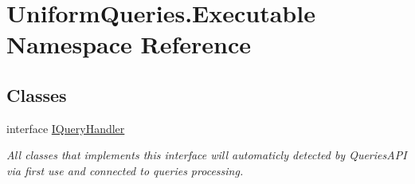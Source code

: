 \hypertarget{namespace_uniform_queries_1_1_executable}{}\section{Uniform\+Queries.\+Executable Namespace Reference}
\label{namespace_uniform_queries_1_1_executable}
\subsection*{Classes}
\begin{DoxyCompactItemize}
\item 
interface \mbox{\hyperlink{interface_uniform_queries_1_1_executable_1_1_i_query_handler}{I\+Query\+Handler}}
\begin{DoxyCompactList}\small\item\em All classes that implements this interface will automaticly detected by Queries\+A\+PI via first use and connected to queries processing. \end{DoxyCompactList}\end{DoxyCompactItemize}

